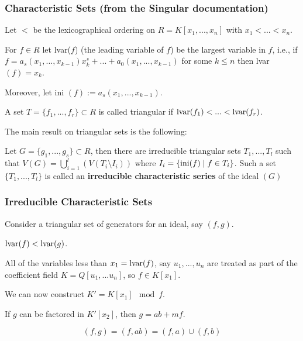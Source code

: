 \documentclass[11pt]{beamer}
\begin{document}
\begin{frame}
\frametitle{Characteristic Sets (from the Singular documentation)}

Let $<$ be the lexicographical ordering on $R=K[x_1,...,x_n]$ with $x_1 < ... < x_n$.

\vskip 12pt
For $f \in R$ let lvar($f$) (the leading variable of $f$) be the largest variable in $f$, i.e., if $f=a_s(x_1,...,x_{k-1})x_k^s+...+a_0(x_1,...,x_{k-1})$ for some $k \leq n$ then lvar$(f)=x_k$.

\vskip 12pt
Moreover, let ini $(f):=a_s(x_1,...,x_{k-1})$.

\vskip 12pt
A set $T=\{f_1,...,f_r\} \subset R$ is called triangular if $\hbox{lvar}(f_1)<...<\hbox{lvar}(f_r)$.








\vskip 12pt
The main result on triangular sets is the following:

\vskip 12pt

Let $G=\{g_1,...,g_s\} \subset R$, then there are irreducible triangular sets $T_1,...,T_l$ such that $V(G)=\bigcup_{i=1}^{l}(V(T_i\setminus I_i))$ where $I_i=\{\hbox{ini}(f) \mid f \in T_i \}$. Such a set $\{T_1,...,T_l\}$ is called an {\bf irreducible characteristic series} of the ideal $(G)$
\end{frame}

\begin{frame}
\frametitle{Irreducible Characteristic Sets}

Consider a triangular set of generators for an ideal, say $(f,g)$.

\vskip 12pt
$\hbox{lvar}(f)<\hbox{lvar}(g)$.

\vskip 12pt
All of the variables less than $x_1 = \hbox{lvar}(f)$, say $u_1,...,u_n$ are treated as part of the coefficient field $K=Q[u_1,...u_n]$,
so $f \in K[x_1]$.

\vskip 12pt
We can now construct $K' = K[x_1] \mod f$.

\vskip 12pt
If $g$ can be factored in $K'[x_2]$, then $g = ab + mf$.

\vskip 12pt
\[ (f,g) = (f,ab) = (f,a) \cup (f,b) \]


\end{frame}
\end{document}
